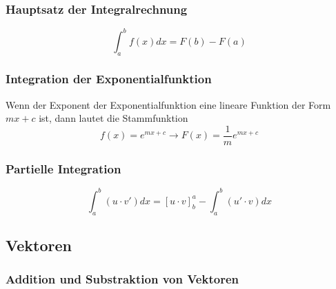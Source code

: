 \documentclass[a4paper,11pt]{article}
\begin{document}
	\subsubsection{Hauptsatz der Integralrechnung} 
	\label{ssub:hauptsatz_der_integralrechnung}
	
	\begin{equation}
		\int_a^b f(x)dx = F(b) - F(a)
	\end{equation}
	
	\subsubsection{Integration der Exponentialfunktion}
	\label{ssub:integration_der_exponentialfunktion}
	
	Wenn der Exponent der Exponentialfunktion eine lineare Funktion der Form $mx+c$ ist, dann lautet die Stammfunktion
	\begin{equation}
		f(x) = e^{mx+c} \rightarrow F(x) = \frac{1}{m} e^{mx+c}
	\end{equation}
	
	\subsubsection{Partielle Integration}
	\label{ssub:partielle_integration}
	\begin{equation}
		\int_a^b (u \cdot v') dx = \left[u \cdot v \right]^a_b - \int_a^b (u' \cdot v) dx
	\end{equation}
	
	\subsection{Vektoren} 
	\label{sub:vektoren}
	
	\subsubsection{Addition und Substraktion von Vektoren} %
	\label{ssub:addition_und_substraktion_von_vektoren}
	
\end{document}
